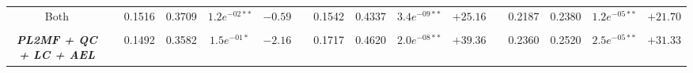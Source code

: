 \begin{table*}
{\begin{tabular}{cc@{\hs}rrccc@{\hs}rrccc@{\hs}rrcc}
                          \\
{\raggedright Both} & \phantom{a} & 0.1516 & 0.3709 & $1.2e^{-02**}$ & $-0.59$
                    & \phantom{a} & 0.1542 & 0.4337 & $3.4e^{-09**}$ & $+25.16$
                    & \phantom{a} & 0.2187 & 0.2380 & $1.2e^{-05**}$ & $+21.70$
        \\
\\
\emph{\textbf{PL2MF + QC + LC + AEL}} & \phantom{a} & 0.1492 & 0.3582 & $1.5e^{-01*}$ & $-2.16$
                                      & \phantom{a} & 0.1717 & 0.4620 & $2.0e^{-08**}$ & $+39.36$
                                      & \phantom{a} & 0.2360 & 0.2520 & $2.5e^{-05**}$ & $+31.33$ \\
\bottomrule
\end{tabular}}
\end{table*}
